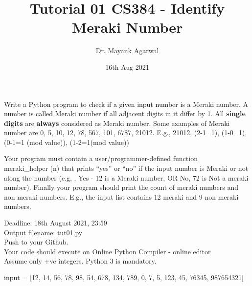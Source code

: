 \documentclass[12pt,  letterpaper,  twoside]{article}
\title{Tutorial 01 CS384 - Identify Meraki Number}
\author{Dr. Mayank Agarwal}
\date{16th Aug 2021}
\begin{document}
	\maketitle  
	
	
	Write a Python program to check if a given input number is a Meraki number. A number is called Meraki number if all adjacent digits in it differ by 1. All \textbf{single digits }are \textbf{always }considered as Meraki number. Some examples of Meraki number are 0,  5,  10,  12,  78,  567,  101,  6787,  21012.  E.g.,  21012,  (2-1=1),  (1-0=1),  (0-1=1 (mod value)),  (1-2=1(mod value))
	
	
	 Your program must contain a user/programmer-defined function \\  meraki\_helper (n) that prints “yes” or “no” if the input number is Meraki or not along the number (e.g, . Yes - 12 is a Meraki number,  OR No,  72 is Not a meraki number). Finally your program should print the count of meraki numbers and non meraki numbers. E.g., the input list contains 12 meraki and 9 non meraki numbers.
	 
	 Deadline: 18th August 2021,  23:59 \\
	 Output filename: tut01.py \\
	 Push to your Github. \\
	 Your code should execute on
	 \href{https://www.onlinegdb.com/online_python_compiler}{Online Python Compiler - online editor} \\
	 Assume only +ve integers. Python 3 is mandatory.
	 
	 input = [12,  14, 56, 78, 98, 54, 678, 134, 789, 0, 7, 5,  123,  45, 76345,  987654321]
	
\end{document}
